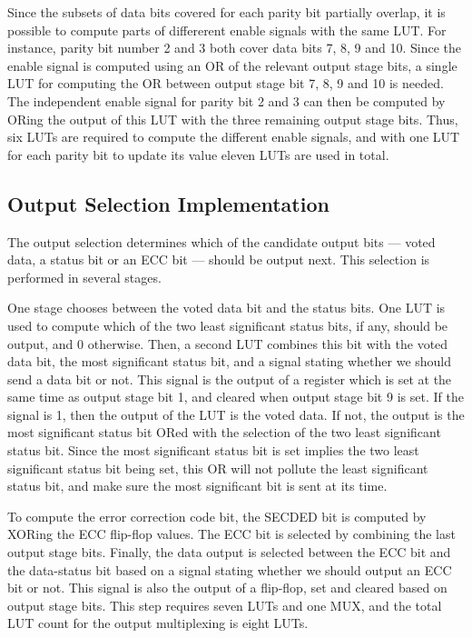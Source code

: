 Since the subsets of data bits covered for each parity bit partially
overlap, it is possible to compute parts of differerent enable signals
with the same LUT. For instance, parity bit number 2 and 3 both cover
data bits 7, 8, 9 and 10. Since the enable signal is computed using an
OR of the relevant output stage bits, a single LUT for computing the
OR between output stage bit 7, 8, 9 and 10 is needed. The independent
enable signal for parity bit 2 and 3 can then be computed by ORing the
output of this LUT with the three remaining output stage bits. Thus,
six LUTs are required to compute the different enable signals, and
with one LUT for each parity bit to update its value eleven LUTs are
used in total.

\subsection{Output Selection Implementation}
The output selection determines which of the candidate output bits ---
voted data, a status bit or an ECC bit --- should be output next. This
selection is performed in several stages. 

One stage chooses between the voted data bit and the status bits. One
LUT is used to compute which of the two least significant status bits,
if any, should be output, and 0 otherwise. Then, a second LUT combines
this bit with the voted data bit, the most significant status bit, and
a signal stating whether we should send a data bit or not. This signal
is the output of a register which is set at the same time as output
stage bit 1, and cleared when output stage bit 9 is set. If the signal
is 1, then the output of the LUT is the voted data. If not, the output
is the most significant status bit ORed with the selection of the two
least significant status bit. Since the most significant status bit is
set implies the two least significant status bit being set, this OR
will not pollute the least significant status bit, and make sure the
most significant bit is sent at its time.

To compute the error correction code bit, the SECDED bit is computed
by XORing the ECC flip-flop values. The ECC bit is selected by
combining the last output stage bits. Finally, the data output is
selected between the ECC bit and the data-status bit based on a signal
stating whether we should output an ECC bit or not. This signal is
also the output of a flip-flop, set and cleared based on output stage
bits. This step requires seven LUTs and one MUX, and the total LUT
count for the output multiplexing is eight LUTs.

